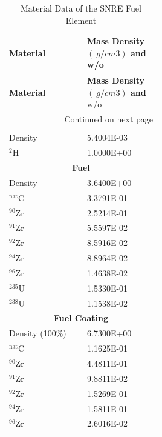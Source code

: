 \documentclass[8pt,a4paper]{article}
\begin{document}
\begin{longtable}{|m{0.3\linewidth}|m{0.2\linewidth}|}
    \caption{Material Data of the SNRE Fuel Element} \\
    
    \hline \textbf{Material} & \textbf{Mass Density $(\SI{}{g/cm3})$ and} w/o \\ \hline 
    \endfirsthead
    
    
    \hline \textbf{Material} & \textbf{Mass Density $(\SI{}{g/cm3})$ and} w/o \\ \hline 
    \endhead
    
    \hline \multicolumn{2}{|r|}{{Continued on next page}} \\ \hline
    \endfoot
    
    \hline
    \endlastfoot
    \multicolumn{2}{|c|}{\textbf{Fuel Element Coolant}}\\\hline
    Density & \SI{5.4004E-03}{} \\
    $^{2}$H & \SI{1.0000E+00}{} \\\hline
    \multicolumn{2}{|c|}{\textbf{Fuel}}\\\hline
    Density & \SI{3.6400E+00}{} \\
    $^{\text{nat}}$C & \SI{3.3791E-01}{} \\
    $^{90}$Zr & \SI{2.5214E-01}{} \\
    $^{91}$Zr & \SI{5.5597E-02}{} \\
    $^{92}$Zr & \SI{8.5916E-02}{} \\
    $^{94}$Zr & \SI{8.8964E-02}{} \\
    $^{96}$Zr & \SI{1.4638E-02}{} \\
    $^{235}$U & \SI{1.5330E-01}{} \\
    $^{238}$U & \SI{1.1538E-02}{} \\\hline
    \multicolumn{2}{|c|}{\textbf{Fuel Coating}}\\\hline
    Density (100\%) & \SI{6.7300E+00}{} \\
    $^{\text{nat}}$C & \SI{1.1625E-01}{} \\
    $^{90}$Zr & \SI{4.4811E-01}{} \\
    $^{91}$Zr & \SI{9.8811E-02}{} \\
    $^{92}$Zr & \SI{1.5269E-01}{} \\
    $^{94}$Zr & \SI{1.5811E-01}{} \\
    $^{96}$Zr & \SI{2.6016E-02}{} \\\hline
\end{longtable}
\end{document}
